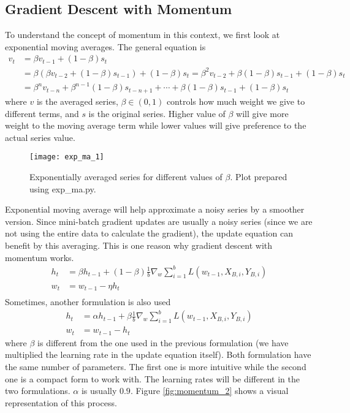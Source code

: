 \documentclass[../../deep_learning_notes.tex]{subfiles}
\begin{document}
\subsection{Gradient Descent with Momentum}\label{sec:gradient_descent_momentum}
To understand the concept of momentum in this context, we first look at exponential moving averages. The general equation is
\begin{align*}
    v_{t} &= \beta v_{t-1} + (1- \beta) s_{t}\\
    &= \beta(\beta v_{t-2} + (1-\beta)s_{t-1}) +(1-\beta) s_{t} = \beta^{2}v_{t-2} + \beta(1-\beta)s_{t-1} + (1-\beta)s_{t}\\
    &= \beta^{n}v_{t-n} + \beta^{n-1}(1-\beta)s_{t-n+1} + \cdots + \beta(1-\beta)s_{t-1} + (1-\beta)s_{t}
\end{align*}
where $v$ is the averaged series, $\beta \in (0,1)$ controls how much weight we give to different terms, and $s$ is the original series. Higher value of $\beta$ will give more weight to the moving average term while lower values will give preference to the actual series value.\newline

\begin{figure}[h]
    \texttt{[image: exp\_ma\_1]}
    \centering
    \caption {Exponentially averaged series for different values of $\beta$. Plot prepared using exp\_ma.py.}
    \label{fig:exp_ma_1} %
\end{figure}

Exponential moving average will help approximate a noisy series by a smoother version. Since mini-batch gradient updates are usually a noisy series (since we are not using the entire data to calculate the gradient), the update equation can benefit by this averaging. This is one reason why gradient descent with momentum works.
\begin{align*}
    h_{t} &= \beta h_{t-1} + (1-\beta) \frac{1}{b}\nabla_{w} \sum_{i=1}^{b} L(w_{t-1}, X_{B,i}, Y_{B,i})\\
    w_{t} &= w_{t-1} - \eta h_{t}\\
\end{align*}
Sometimes, another formulation is also used
\begin{align*}
    h_{t} &= \alpha h_{t-1} + \beta \frac{1}{b}\nabla_{w} \sum_{i=1}^{b} L(w_{t-1}, X_{B,i}, Y_{B,i})\\
    w_{t} &= w_{t-1} - h_{t}
\end{align*}
where $\beta$ is different from the one used in the previous formulation (we have multiplied the learning rate in the update equation itself). Both formulation have the same number of parameters. The first one is more intuitive while the second one is a compact form to work with. The learning rates will be different in the two formulations. $\alpha$ is usually $0.9$. Figure \ref{fig:momentum_2} shows a visual representation of this process.\newline
\end{document}
